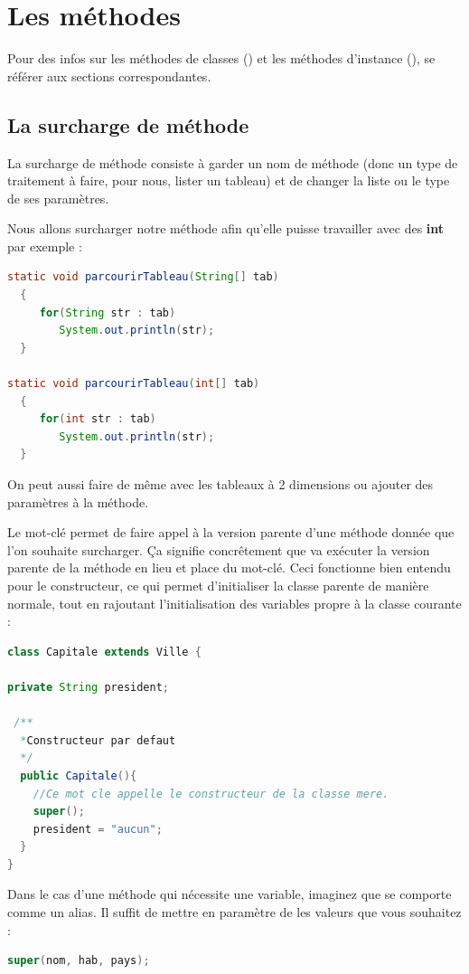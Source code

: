 \documentclass[a4paper,twoside]{article}
\begin{document}
\section{Les méthodes}
Pour des infos sur les méthodes de classes () et les méthodes d'instance (), se référer aux sections correspondantes.
\subsection{La surcharge de méthode}\label{sec:surcharge}
La surcharge de méthode consiste à garder un nom de méthode (donc un type de traitement à faire, pour nous, lister un tableau) et de changer la liste ou le type de ses paramètres.

Nous allons surcharger notre méthode afin qu'elle puisse travailler avec des \textbf{int} par exemple :
\begin{lstlisting}[language=java]
static void parcourirTableau(String[] tab)
  {
     for(String str : tab)
        System.out.println(str);
  }
        
static void parcourirTableau(int[] tab)
  {
     for(int str : tab)
        System.out.println(str);
  }
\end{lstlisting}

On peut aussi faire de même avec les tableaux à 2 dimensions ou ajouter des paramètres à la méthode.

\bigskip

Le mot-clé  permet de faire appel à la version parente d'une méthode donnée que l'on souhaite surcharger. Ça signifie concrêtement que  va exécuter la version parente de la méthode en lieu et place du mot-clé. Ceci fonctionne bien entendu pour le constructeur, ce qui permet d'initialiser la classe parente de manière normale, tout en rajoutant l'initialisation des variables propre à la classe courante : 
\begin{lstlisting}[language=java]
class Capitale extends Ville {
 
private String president;
 
 /**
  *Constructeur par defaut
  */
  public Capitale(){
    //Ce mot cle appelle le constructeur de la classe mere.  
    super();
    president = "aucun";
  }
}
\end{lstlisting}

\begin{remarque}
Dans le cas d'une méthode qui nécessite une variable, imaginez que  se comporte comme un alias. Il suffit de mettre en paramètre de  les valeurs que vous souhaitez : 
\begin{lstlisting}[language=java]
super(nom, hab, pays);
\end{lstlisting}
\end{remarque}
\end{document}
